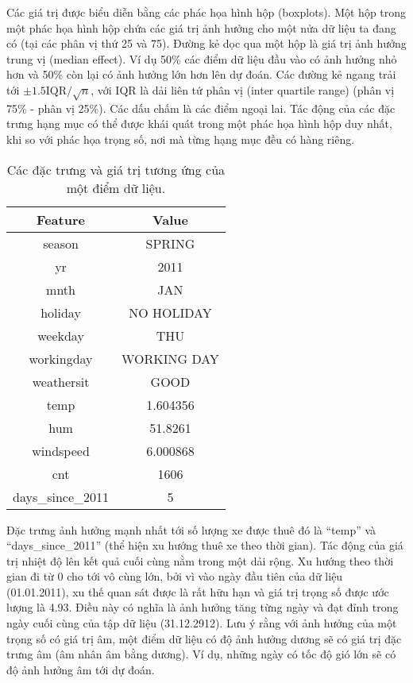 Các giá trị được biểu diễn bằng các phác họa hình hộp (boxplots). Một hộp trong một phác họa hình hộp chứa các giá trị ảnh hưởng cho một nửa dữ liệu ta đang có (tại các phân vị thứ 25 và 75). Đường kẻ dọc qua một hộp là giá trị ảnh hưởng trung vị (median effect). Ví dụ 50\% các điểm dữ liệu đầu vào có ảnh hưởng nhỏ hơn và 50\% còn lại có ảnh hưởng lớn hơn lên dự đoán. Các đường kẻ ngang trải tới $\pm1.5\text{IQR}/\sqrt{n}$, với IQR là dải liên tứ phân vị (inter quartile range) (phân vị 75\% - phân vị 25\%). Các dấu chấm là các điểm ngoại lai. Tác động của các đặc trưng hạng mục có thể được khái quát trong một phác họa hình hộp duy nhất, khi so với phác họa trọng số, nơi mà từng hạng mục đều có hàng riêng.

\begin{table*}[hbt!]
\centering
\begin{tabular}{|c|c|}
\hline
Feature           & Value       \\ \hline
season            & SPRING      \\ \hline
yr                & 2011        \\ \hline
mnth              & JAN         \\ \hline
holiday           & NO HOLIDAY  \\ \hline
weekday           & THU         \\ \hline
workingday        & WORKING DAY \\ \hline
weathersit        & GOOD        \\ \hline
temp              & 1.604356    \\ \hline
hum               & 51.8261     \\ \hline
windspeed         & 6.000868    \\ \hline
cnt               & 1606        \\ \hline
days\_since\_2011 & 5           \\ \hline
\end{tabular}
\caption{Các đặc trưng và giá trị tương ứng của một điểm dữ liệu.}
\label{tab:4_3}
\end{table*}

Đặc trưng ảnh hưởng mạnh nhất tới số lượng xe được thuê đó là ``temp'' và ``days\_since\_2011'' (thể hiện xu hướng thuê xe theo thời gian). Tác động của giá trị nhiệt độ lên kết quả cuối cùng nằm trong một dải rộng. Xu hướng theo thời gian đi từ 0 cho tới vô cùng lớn, bởi vì vào ngày đầu tiên của dữ liệu (01.01.2011), xu thế quan sát được là rất hữu hạn và giá trị trọng số được ước lượng là 4.93. Điều này có nghĩa là ảnh hưởng tăng từng ngày và đạt đỉnh trong ngày cuối cùng của tập dữ liệu (31.12.2912). Lưu ý rằng với ảnh hưởng của một trọng số có giá trị âm, một điểm dữ liệu có độ ảnh hưởng dương sẽ có giá trị đặc trưng âm (âm nhân âm bằng dương). Ví dụ, những ngày có tốc độ gió lớn sẽ có độ ảnh hưởng âm tới dự đoán.

